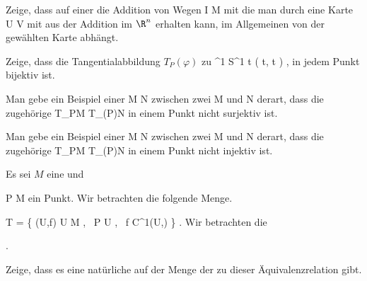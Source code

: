 {}
{

Zeige, dass auf einer
 die Addition von Wegen
 { I } { M
} {}
mit
 die man durch eine Karte
\maabbdisp {\alpha} { U } { V
} {}
mit
 aus der Addition im $\R^n$ erhalten kann, im Allgemeinen von der gewählten Karte abhängt.

}
{} {}

{}
{

Zeige, dass die Tangentialabbildung $T_P(\varphi)$ zu
\maabbeledisp {\varphi} {\R^1} {S^1
} { t } {( \cos  t, \sin  t  )
} {,}
in jedem Punkt
 bijektiv ist.

}
{} {}

{}
{

Man gebe ein Beispiel einer
\maabbdisp {\varphi} { M } { N
} {}
zwischen zwei
\mathkor {} {M} {und} {N} {}
derart, dass die zugehörige
 {T_PM} {T_{\varphi(P)}N
} {}
in einem Punkt
 nicht surjektiv ist.

}
{} {}

{}
{

Man gebe ein Beispiel einer
\maabbdisp {\varphi} { M } { N
} {}
zwischen zwei
\mathkor {} {M} {und} {N} {}
derart, dass die zugehörige
 {T_PM} {T_{\varphi(P)}N
} {}
in einem Punkt
 nicht injektiv ist.

}
{} {}

{}
{

Es sei $M$ eine
und

\mavergleichskette
{\vergleichskette
{ P
}
{ \in }{ M
}
{  }{
}
{    }{
}
{   }{
}
}
{}{}{}
ein Punkt. Wir betrachten die folgende Menge.

\mavergleichskettedisp
{\vergleichskette
{ T
}
{ =} { \left\{  (U,f)   \mid   U \subseteq M  , \,  P \in U   , \,  f \in C^1(U,\R)    \right\}
}
{ } {
}
{ } {
}
{ } {
}
}
{}{}{.}
Wir betrachten die

 { . }

 {Zeige, dass es eine natürliche
auf der Menge der
zu dieser Äquivalenzrelation gibt.
}

}
{} {}

